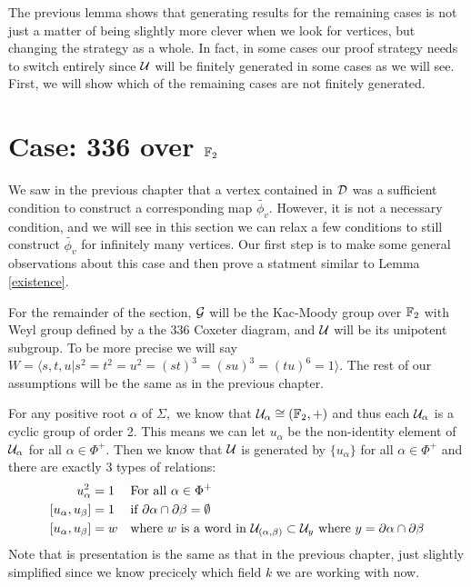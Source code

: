 \documentclass[class=book, crop=false]{standalone}
\begin{document}
The previous lemma shows that generating results for the remaining cases is not just a matter of being slightly more clever when we look for vertices, but changing the strategy as a whole. In fact, in some cases our proof strategy needs to switch entirely since $\mathcal{U}$ will be finitely generated in some cases as we will see. First, we will show which of the remaining cases are not finitely generated.

\section{Case: 336 over $\mathbb{F}_{2}$}
We saw in the previous chapter that a vertex contained in $\mathcal{D}$ was a sufficient condition to construct a corresponding map $\tilde{\phi_v}.$ However, it is not a necessary condition, and we will see in this section we can relax a few conditions to still construct $\tilde{\phi_v}$ for infinitely many vertices. Our first step is to make some general observations about this case and then prove a statment similar to Lemma \ref{existence}.

For the remainder of the section, $\mathcal{G}$ will be the Kac-Moody group over $\mathbb{F}_{2}$ with Weyl group defined by a the 336 Coxeter diagram, and $\mathcal{U}$ will be its unipotent subgroup. To be more precise we will say $W=\langle s,t,u|s^2=t^2=u^2=(st)^3=(su)^3=(tu)^6=1\rangle.$ The rest of our assumptions will be the same as in the previous chapter.

For any positive root $\alpha$ of $\Sigma,$ we know that $\mathcal{U}_\alpha\cong (\mathbb{F}_{2},+)$ and thus each $\mathcal{U}_\alpha$ is a cyclic group of order 2. This means we can let $u_\alpha$ be the non-identity element of $\mathcal{U}_\alpha$ for all $\alpha\in \Phi^+.$ Then we know that $\mathcal{U}$ is generated by $\{u_\alpha\}$ for all $\alpha\in \Phi^+$ and there are exactly 3 types of relations:
\begin{align*}
	u_\alpha^2&=1&&\text{For all }\alpha\in \Phi^+\\
[u_\alpha,u_\beta]&=1&&\text{if }\partial\alpha\cap \partial\beta=\emptyset\\
[u_\alpha,u_\beta]&=w&&\text{where }w\text{ is a word in }\mathcal{U}_{(\alpha,\beta)}\subset \mathcal{U}_y\text{ where }y=\partial\alpha\cap \partial\beta
\end{align*}
Note that is presentation is the same as that in the previous chapter, just slightly simplified since we know precicely which field $k$ we are working with now.
\end{document}
